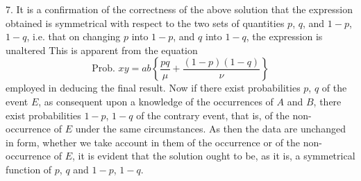 \documentclass[oneside]{book}
\begin{document}
7. It is a confirmation of the correctness of the above solution
that the expression obtained is symmetrical with respect to the
two sets of quantities $p$, $q$, and $1 - p$, $1 - q$, i.e. that on changing
$p$ into $1 - p$, and $q$ into $1 - q$, the expression is unaltered This
is apparent from the equation
\[
  \text{Prob. }xy
  = ab\left\{ \frac{pq}{\mu} + \frac{(1-p)(1-q)}{\nu} \right\}
\]
employed in deducing the final result. Now if there exist probabilities $p$, $q$ of the event $E$, as consequent upon a knowledge
of the occurrences of $A$ and $B$, there exist probabilities $1 - p$, $1 - q$
of the contrary event, that is, of the non-occurrence of $E$ under
the same circumstances. As then the data are unchanged in
form, whether we take account in them of the occurrence or of
the non-occurrence of $E$, it is evident that the solution ought to
be, as it is, a symmetrical function of $p$, $q$ and $1 - p$, $1 - q$.
\end{document}
